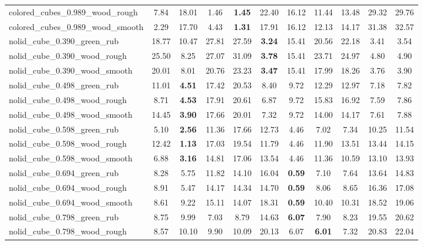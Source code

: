 \begin{table}[H]
{\begin{tabular}{l cccccccccc}
        colored\_cubes\_0.989\_wood\_rough & 7.84 & 18.01 & 1.46 & \textbf{1.45} & 22.40 & 16.12 & 11.44 & 13.48 & 29.32 & 29.76 \\
        colored\_cubes\_0.989\_wood\_smooth & 2.29 & 17.70 & 4.43 & \textbf{1.31} & 17.91 & 16.12 & 12.13 & 14.17 & 31.38 & 32.57 \\
        nolid\_cube\_0.390\_green\_rub & 18.77 & 10.47 & 27.81 & 27.59 & \textbf{3.24} & 15.41 & 20.56 & 22.18 & 3.41 & 3.54 \\
        nolid\_cube\_0.390\_wood\_rough & 25.50 & 8.25 & 27.07 & 31.09 & \textbf{3.78} & 15.41 & 23.71 & 24.97 & 4.80 & 4.90 \\
        nolid\_cube\_0.390\_wood\_smooth & 20.01 & 8.01 & 20.76 & 23.23 & \textbf{3.47} & 15.41 & 17.99 & 18.26 & 3.76 & 3.90 \\
        nolid\_cube\_0.498\_green\_rub & 11.01 & \textbf{4.51} & 17.42 & 20.53 & 8.40 & 9.72 & 12.29 & 12.97 & 7.18 & 7.82 \\
        nolid\_cube\_0.498\_wood\_rough & 8.71 & \textbf{4.53} & 17.91 & 20.61 & 6.87 & 9.72 & 15.83 & 16.92 & 7.59 & 7.86 \\
        nolid\_cube\_0.498\_wood\_smooth & 14.45 & \textbf{3.90} & 17.66 & 20.01 & 7.32 & 9.72 & 14.00 & 14.17 & 7.61 & 7.88 \\
        nolid\_cube\_0.598\_green\_rub & 5.10 & \textbf{2.56} & 11.36 & 17.66 & 12.73 & 4.46 & 7.02 & 7.34 & 10.25 & 11.54 \\
        nolid\_cube\_0.598\_wood\_rough & 12.42 & \textbf{1.13} & 17.03 & 19.54 & 11.79 & 4.46 & 11.90 & 13.51 & 13.44 & 14.15 \\
        nolid\_cube\_0.598\_wood\_smooth & 6.88 & \textbf{3.16} & 14.81 & 17.06 & 13.54 & 4.46 & 11.36 & 10.59 & 13.10 & 13.93 \\
        nolid\_cube\_0.694\_green\_rub & 8.28 & 5.75 & 11.82 & 14.10 & 16.04 & \textbf{0.59} & 7.10 & 7.64 & 13.64 & 14.83 \\
        nolid\_cube\_0.694\_wood\_rough & 8.91 & 5.47 & 14.17 & 14.34 & 14.70 & \textbf{0.59} & 8.06 & 8.65 & 16.36 & 17.08 \\
        nolid\_cube\_0.694\_wood\_smooth & 8.61 & 9.22 & 15.11 & 14.07 & 18.31 & \textbf{0.59} & 10.40 & 10.31 & 18.52 & 19.06 \\
        nolid\_cube\_0.798\_green\_rub & 8.75 & 9.99 & 7.03 & 8.79 & 14.63 & \textbf{6.07} & 7.90 & 8.23 & 19.55 & 20.62 \\
        nolid\_cube\_0.798\_wood\_rough & 8.57 & 10.10 & 9.90 & 10.09 & 20.13 & 6.07 & \textbf{6.01} & 7.32 & 20.83 & 22.04 \\

\end{tabular}}
\end{table}
